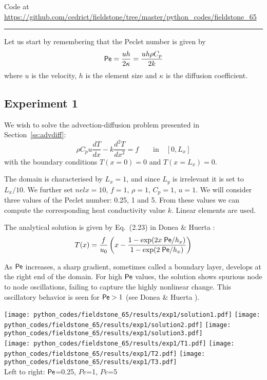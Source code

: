 

\begin{center}
Code at \url{https://github.com/cedrict/fieldstone/tree/master/python_codes/fieldstone_65}
\end{center}

\par\noindent\rule{\textwidth}{0.4pt}

Let us start by remembering that the Peclet number is given by 
\[
{\mathsf{Pe}} = \frac{uh}{2\kappa} = \frac{uh\rho C_p}{2 k}
\]
where $u$ is the velocity, $h$ is the element size and $\kappa$ is the diffusion coefficient.

\subsection*{Experiment 1}
We wish to solve the advection-diffusion problem presented in 
Section~\ref{ss:advdiff}:
\begin{equation}
\rho C_p u \frac{dT}{dx} - k \frac{d^2T}{dx^2} = f \qquad \text{in} \quad [0,L_x]
\end{equation}
with the boundary conditions $T(x=0)=0$ and $T(x=L_x)=0$.

The domain is characterised by $L_x=1$, and since $L_y$ is irrelevant it is set to $L_x/10$.
We further set $nelx=10$, $f=1$, $\rho=1$, $C_p=1$, $u=1$.
We will consider three values of the Peclet number: 0.25, 1 and 5.
From these values we can compute the corresponding heat conductivity value $k$.
Linear elements are used.

The analytical solution is given by Eq.~(2.23) in Donea \& Huerta \cite{dohu03}:
\[
T(x)= \frac{f}{u_0} \left(  x - \frac{1-\exp(2x \; {\mathsf{Pe}} /h_x)}{1-\exp(2\; {\mathsf{Pe}} / h_x)} \right) 
\]

As ${\mathsf{Pe}}$ increases, a sharp gradient, sometimes called a boundary layer,
develops at the right end of the domain. For high ${\mathsf{Pe}}$ values, the solution shows 
spurious node to node oscillations, failing to capture the highly nonlinear change. This oscillatory
behavior is seen for ${\mathsf{Pe}}>1$ (see Donea \& Huerta \cite{dohu03}).

\begin{center}
\texttt{[image: python\_codes/fieldstone\_65/results/exp1/solution1.pdf]}
\texttt{[image: python\_codes/fieldstone\_65/results/exp1/solution2.pdf]}
\texttt{[image: python\_codes/fieldstone\_65/results/exp1/solution3.pdf]}\\
\texttt{[image: python\_codes/fieldstone\_65/results/exp1/T1.pdf]}
\texttt{[image: python\_codes/fieldstone\_65/results/exp1/T2.pdf]}
\texttt{[image: python\_codes/fieldstone\_65/results/exp1/T3.pdf]}\\
{\captionfont Left to right: ${\mathsf{Pe}}$=0.25, $Pe$=1, $Pe$=5}
\end{center}

